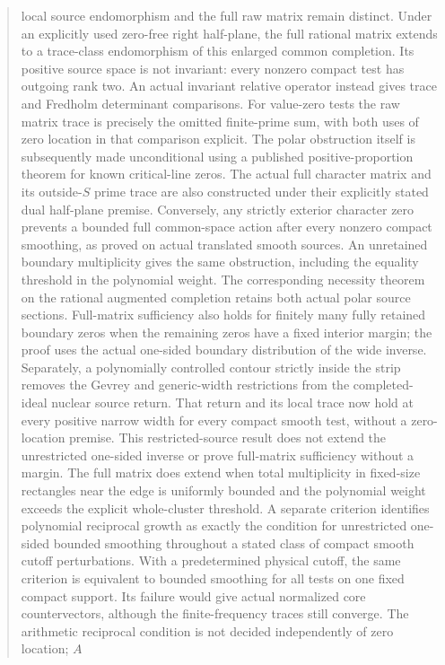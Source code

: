 \documentclass[11pt,a4paper]{article}
\begin{document}
\begin{abstract}
local source endomorphism and the full raw matrix remain distinct.
Under an explicitly used zero-free right half-plane, the full
rational matrix extends to a trace-class endomorphism of this
enlarged common completion. Its positive source space is not
invariant: every nonzero compact test has outgoing rank two.
An actual invariant relative operator instead gives trace and
Fredholm determinant comparisons. For value-zero tests the raw
matrix trace is precisely the omitted finite-prime sum, with
both uses of zero location in that comparison explicit.
The polar obstruction itself is subsequently made
unconditional using a published positive-proportion theorem
for known critical-line zeros. The actual full character
matrix and its outside-$S$ prime trace are also constructed
under their explicitly stated dual half-plane premise.
Conversely, any strictly exterior character zero prevents a
bounded full common-space action after every nonzero compact
smoothing, as proved on actual translated smooth sources.
An unretained boundary multiplicity gives the same obstruction,
including the equality threshold in the polynomial weight.
The corresponding necessity theorem on the rational augmented
completion retains both actual polar source sections.
Full-matrix sufficiency also holds for finitely many fully retained
boundary zeros when the remaining zeros have a fixed interior margin;
the proof uses the actual one-sided boundary distribution of the
wide inverse. Separately, a polynomially controlled contour strictly
inside the strip removes the Gevrey and generic-width restrictions
from the completed-ideal nuclear source return. That return and its
local trace now hold at every positive narrow width for every compact
smooth test, without a zero-location premise. This restricted-source
result does not extend the unrestricted one-sided inverse or prove
full-matrix sufficiency without a margin.
The full matrix does extend when total multiplicity in fixed-size
rectangles near the edge is uniformly bounded and the polynomial
weight exceeds the explicit whole-cluster threshold. A separate
criterion identifies polynomial reciprocal growth as exactly the
condition for unrestricted one-sided bounded smoothing throughout
a stated class of compact smooth cutoff perturbations. With a
predetermined physical cutoff, the same criterion is equivalent
to bounded smoothing for all tests on one fixed compact support. Its failure
would give actual normalized core countervectors, although the
finite-frequency traces still converge. The arithmetic reciprocal
condition is not decided independently of zero location; $A$

\end{abstract}
\end{document}
